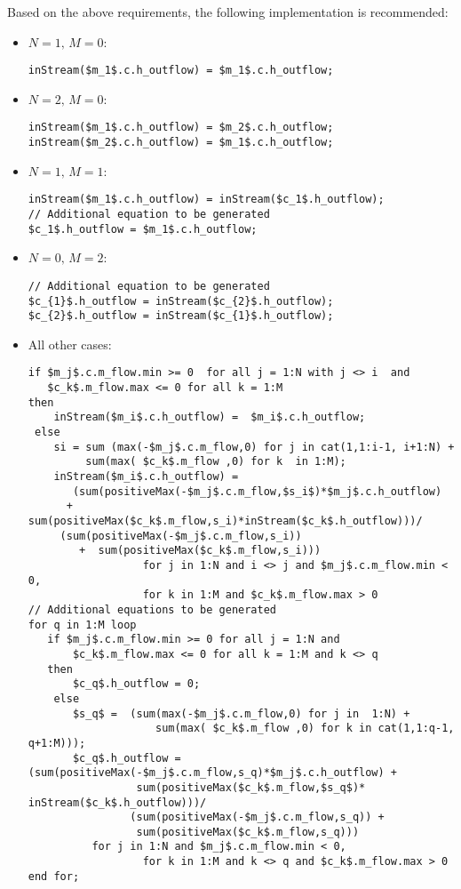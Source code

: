 \begin{nonnormative}
Based on the above requirements, the following implementation is recommended:
\begin{itemize}
\item $N = 1,\, M = 0$:\hfill
\begin{lstlisting}[language=modelica,mathescape=true]
inStream($m_1$.c.h_outflow) = $m_1$.c.h_outflow;
\end{lstlisting}
\item $N = 2,\, M = 0$:\hfill
\begin{lstlisting}[language=modelica,mathescape=true]
inStream($m_1$.c.h_outflow) = $m_2$.c.h_outflow;
inStream($m_2$.c.h_outflow) = $m_1$.c.h_outflow;
\end{lstlisting}
\item $N = 1,\, M = 1$:\hfill
\begin{lstlisting}[language=modelica,mathescape=true]
inStream($m_1$.c.h_outflow) = inStream($c_1$.h_outflow);
// Additional equation to be generated
$c_1$.h_outflow = $m_1$.c.h_outflow;
\end{lstlisting}
\item $N = 0,\, M = 2$:\hfill
\begin{lstlisting}[language=modelica,mathescape=true]
// Additional equation to be generated
$c_{1}$.h_outflow = inStream($c_{2}$.h_outflow);
$c_{2}$.h_outflow = inStream($c_{1}$.h_outflow);
\end{lstlisting}
\item All other cases:\hfill
\begin{lstlisting}[language=modelica,mathescape=true]
if $m_j$.c.m_flow.min >= 0  for all j = 1:N with j <> i  and
   $c_k$.m_flow.max <= 0 for all k = 1:M
then
    inStream($m_i$.c.h_outflow) =  $m_i$.c.h_outflow;
 else
    si = sum (max(-$m_j$.c.m_flow,0) for j in cat(1,1:i-1, i+1:N) +
         sum(max( $c_k$.m_flow ,0) for k  in 1:M);
    inStream($m_i$.c.h_outflow) =
       (sum(positiveMax(-$m_j$.c.m_flow,$s_i$)*$m_j$.c.h_outflow)
      +  sum(positiveMax($c_k$.m_flow,s_i)*inStream($c_k$.h_outflow)))/
     (sum(positiveMax(-$m_j$.c.m_flow,s_i))
        +  sum(positiveMax($c_k$.m_flow,s_i)))
                  for j in 1:N and i <> j and $m_j$.c.m_flow.min < 0,
                  for k in 1:M and $c_k$.m_flow.max > 0
// Additional equations to be generated
for q in 1:M loop
   if $m_j$.c.m_flow.min >= 0 for all j = 1:N and
       $c_k$.m_flow.max <= 0 for all k = 1:M and k <> q
   then
       $c_q$.h_outflow = 0;
    else
       $s_q$ =  (sum(max(-$m_j$.c.m_flow,0) for j in  1:N) +
                    sum(max( $c_k$.m_flow ,0) for k in cat(1,1:q-1, q+1:M)));
       $c_q$.h_outflow = (sum(positiveMax(-$m_j$.c.m_flow,s_q)*$m_j$.c.h_outflow) +
                 sum(positiveMax($c_k$.m_flow,$s_q$)* inStream($c_k$.h_outflow)))/
                (sum(positiveMax(-$m_j$.c.m_flow,s_q)) +
                 sum(positiveMax($c_k$.m_flow,s_q)))
		  for j in 1:N and $m_j$.c.m_flow.min < 0,
                  for k in 1:M and k <> q and $c_k$.m_flow.max > 0
end for;
\end{lstlisting}
\end{itemize}


\end{nonnormative}

